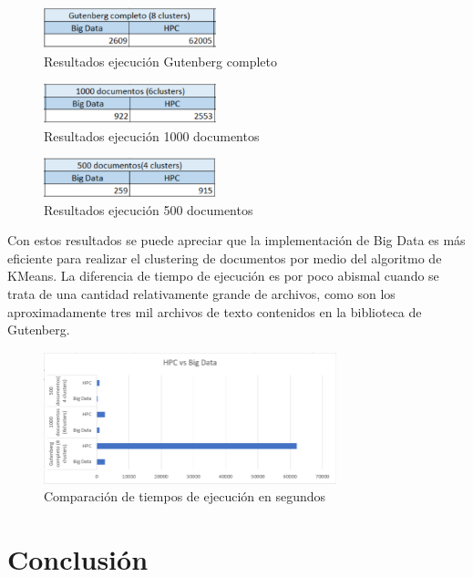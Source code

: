\documentclass[fleqn,10pt]{SelfArx} %
\begin{document}
\begin{figure}[ht]\centering
\includegraphics[width=50mm,]{hvb1}
\caption{Resultados ejecución Gutenberg completo}
\label{fig:tabla1}
\end{figure}

\begin{figure}[ht]\centering
\includegraphics[width=50mm,]{hvb2}
\caption{Resultados ejecución 1000 documentos}
\label{fig:tabla1}
\end{figure}

\begin{figure}[ht]\centering
\includegraphics[width=50mm,]{hvb3}
\caption{Resultados ejecución 500 documentos}
\label{fig:tabla1}
\end{figure}

Con estos resultados se puede apreciar que la implementación de Big Data es más eficiente para realizar el clustering de documentos por medio del algoritmo de KMeans. La diferencia de tiempo de ejecución es por poco abismal cuando se trata de una cantidad relativamente grande de archivos, como son los aproximadamente tres mil archivos de texto contenidos en la biblioteca de Gutenberg.

\begin{figure}[ht]\centering
\includegraphics[width=85mm,]{chart1}
\caption{Comparación de tiempos de ejecución en segundos}
\label{fig:tabla1}
\end{figure}

\section{Conclusión}
\end{document}
